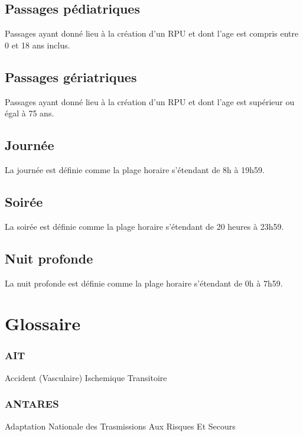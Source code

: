\documentclass[12pt,english,french,twoside]{report}\usepackage[]{graphicx}\usepackage[]{color}
\begin{document}
\section*{Passages pédiatriques}
Passages ayant donné lieu à la création d'un RPU et dont l'age est compris entre 0 et 18 ans inclus.

\section*{Passages gériatriques}
Passages ayant donné lieu à la création d'un RPU et dont l'age est supérieur ou égal à 75 ans.

\section*{Journée}
La journée est définie comme la plage horaire s'étendant de 8h à 19h59.

\section*{Soirée}
La soirée est définie comme la plage horaire s'étendant de 20 heures à 23h59.

\section*{Nuit profonde}
La nuit profonde est définie comme la plage horaire s'étendant de 0h à 7h59.




\newpage
\chapter{Glossaire}





\subsection*{AIT}
Accident (Vasculaire) Ischemique Transitoire

\subsection*{ANTARES}
Adaptation Nationale des Trasmissions Aux Risques Et Secours
\end{document}

